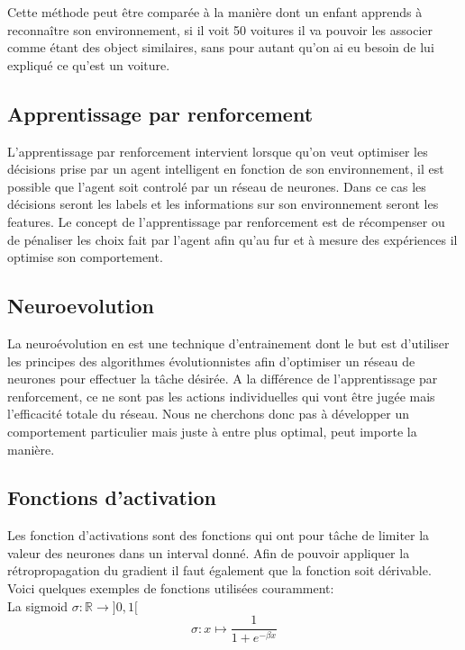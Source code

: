 \documentclass{article}
\begin{document}
Cette méthode peut être comparée à la manière dont un enfant apprends à reconnaître son environnement, si il voit 50 voitures il va pouvoir les associer comme étant des object similaires, sans pour autant qu'on ai eu besoin de lui expliqué ce qu'est un voiture.

\subsection{Apprentissage par renforcement}

L'apprentissage par renforcement intervient lorsque qu'on veut optimiser les décisions prise par un agent intelligent en fonction de son environnement, il est possible que l'agent soit controlé par un réseau de neurones. Dans ce cas les décisions seront les labels et les informations sur son environnement seront les features. Le concept de l'apprentissage par renforcement est de récompenser ou de pénaliser les choix fait par l'agent afin qu'au fur et à mesure des expériences il optimise son comportement.\cite{wikirl}

\subsection{Neuroevolution}

La neuroévolution en est une technique d'entrainement dont le but est d'utiliser les principes des algorithmes évolutionnistes afin d'optimiser un réseau de neurones pour effectuer la tâche désirée. A la différence de l'apprentissage par renforcement, ce ne sont pas les actions individuelles qui vont être jugée mais l'efficacité totale du réseau. Nous ne cherchons donc pas à développer un comportement particulier mais juste à entre plus optimal, peut importe la manière.\cite{wikineuroevolution}\\

\subsection{Fonctions d'activation}

Les fonction d'activations sont des fonctions qui ont pour tâche de limiter la valeur des neurones dans un interval donné. Afin de pouvoir appliquer la rétropropagation du gradient il faut également que la fonction soit dérivable.
Voici quelques exemples de fonctions utilisées couramment:\\

La sigmoid $\sigma : \mathbb{R} \rightarrow ]0, 1[$
\begin{equation}
	\sigma : x \mapsto \frac{1}{1 + e^{-\beta x}}
\end{equation}
\end{document}
